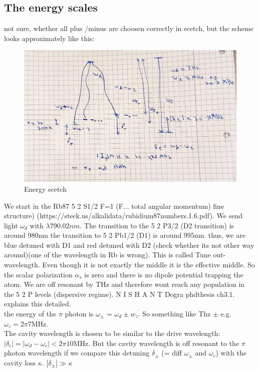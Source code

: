 \subsection{The energy scales}
not sure, whether all plus /minus are choosen correctly in scetch, but the scheme looks approximately like this:  
\begin{figure}[h!]
	\centering
	\includegraphics[width=1\linewidth]{Images/energy_scetch.jpeg}
	\caption{Energy scetch}
	\label{fig:energy_scales}
\end{figure}
We start in the Rb87 5 2 S1/2 F=1 (F... total angular momentum) fine structure) (https://steck.us/alkalidata/rubidium87numbers.1.6.pdf). We send light $\omega_d$ with $\lambda 790.02nm$. The transition to the  5 2 P3/2 (D2 transition) is around 980nm the transition to 5 2 Pb1/2 (D1) is around 995nm. thus, we are blue detuned with D1 and red detuned with D2 (check whether its not other way around)(one of the wavelength in Rb is wrong). This is called Tune out-wavelength. Even though it is not exactly the middle it is the effective middle. So the scalar polarization $\alpha_s$ is zero and there is no dipole potential trapping the atom. We are off resonant by THz and therefore wont reach any population in the 5 2 P levels (dispersive regime). N I S H A N T  Dogra phdthesis ch3.1. explains this detailed. 
\\
the energy of the $\pi$ photon is $\omega_\pm$ = $\omega_d \pm w_z$. So something like Thz $\pm$ e.g. $\omega_z = 2\pi 7 $MHz.
\\
The cavity wavelength is chosen to be similar to the drive wavelength: $|\delta_c| = |\omega_d - \omega_c| < 2\pi 10$MHz. But the cavity wavelength is off resonant to the $\pi$ photon wavelength if we compare this detuning $\delta_\pm$ (= diff $\omega_\pm$ and $\omega_c$) with the cavity loss $\kappa$. $|\delta_\pm | \gg \kappa$
